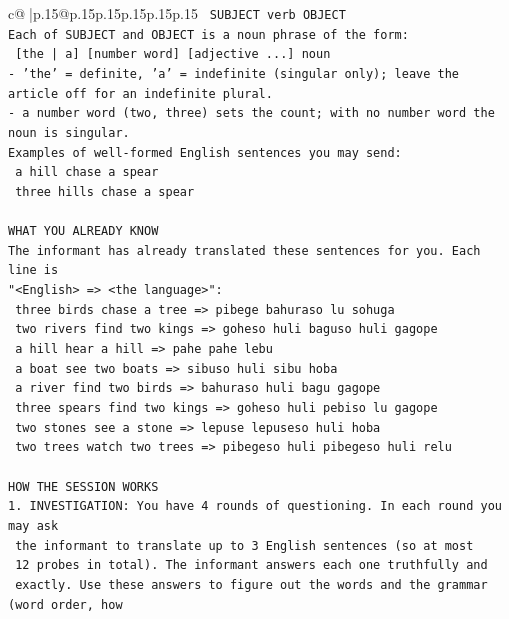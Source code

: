 \documentclass{article}
\begin{document}
{\begin{supertabular}{c@{$\;$}|p{.15\linewidth}@{}p{.15\linewidth}p{.15\linewidth}p{.15\linewidth}p{.15\linewidth}p{.15\linewidth}}
{{{\texttt{    SUBJECT  verb  OBJECT} \\
\texttt{Each of SUBJECT and OBJECT is a noun phrase of the form:} \\
\texttt{    {[}the | a{]}  {[}number word{]}  {[}adjective ...{]}  noun} \\
\texttt{{-} 'the' = definite, 'a' = indefinite (singular only); leave the article off for an indefinite plural.} \\
\texttt{{-} a number word (two, three) sets the count; with no number word the noun is singular.} \\
\texttt{Examples of well{-}formed English sentences you may send:} \\
\texttt{    a hill chase a spear} \\
\texttt{    three hills chase a spear} \\
\\ 
\texttt{WHAT YOU ALREADY KNOW} \\
\texttt{The informant has already translated these sentences for you. Each line is} \\
\texttt{"<English>  =>  <the language>":} \\
\texttt{    three birds chase a tree  =>  pibege bahuraso lu sohuga} \\
\texttt{    two rivers find two kings  =>  goheso huli baguso huli gagope} \\
\texttt{    a hill hear a hill  =>  pahe pahe lebu} \\
\texttt{    a boat see two boats  =>  sibuso huli sibu hoba} \\
\texttt{    a river find two birds  =>  bahuraso huli bagu gagope} \\
\texttt{    three spears find two kings  =>  goheso huli pebiso lu gagope} \\
\texttt{    two stones see a stone  =>  lepuse lepuseso huli hoba} \\
\texttt{    two trees watch two trees  =>  pibegeso huli pibegeso huli relu} \\
\\ 
\texttt{HOW THE SESSION WORKS} \\
\texttt{1. INVESTIGATION: You have 4 rounds of questioning. In each round you may ask} \\
\texttt{   the informant to translate up to 3 English sentences (so at most} \\
\texttt{   12 probes in total). The informant answers each one truthfully and} \\
\texttt{   exactly. Use these answers to figure out the words and the grammar (word order, how} \\
}}}
\end{supertabular}}
\end{document}
